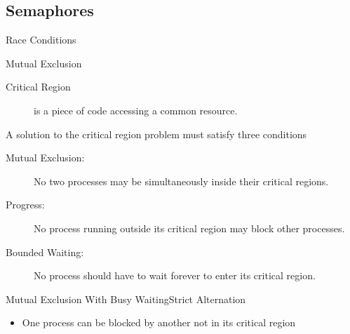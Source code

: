 \subsection{Semaphores}
\label{sec:semaphores}

\begin{frame}{Race Conditions}
  \begin{center}
  \end{center}
\end{frame}

\begin{frame}{Mutual Exclusion}
  \begin{description}
  \item[Critical Region] is a piece of code accessing a common resource.
  \end{description}
  \begin{center}
  \end{center}
\end{frame}

\begin{frame}
  \begin{block}{A solution to the critical region problem must satisfy three conditions}
    \begin{description}
    \item[Mutual Exclusion:] No two processes may be simultaneously inside their critical
      regions.
    \item[Progress:] No process running outside its critical region may block other
      processes.
    \item[Bounded Waiting:] No process should have to wait forever to enter its critical
      region.
    \end{description}
  \end{block}
\end{frame}

\begin{frame}{Mutual Exclusion With Busy Waiting}{Strict Alternation}
  \begin{center}
  \end{center}
  \begin{itemize}
  \item[\Bad] One process can be blocked by another not in its critical region
  \end{itemize}
\end{frame}

